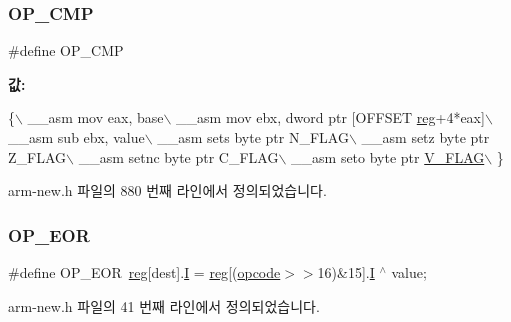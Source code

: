 \subsubsection{\texorpdfstring{O\+P\+\_\+\+C\+MP}{OP\_CMP}\hspace{0.1cm}{\footnotesize\ttfamily [2/2]}}
{\footnotesize\ttfamily \#define O\+P\+\_\+\+C\+MP}

{\bfseries 값\+:}
\begin{DoxyCode}
\{\(\backslash\)
       \_\_asm mov eax, base\(\backslash\)
       \_\_asm mov ebx, dword ptr [OFFSET \mbox{\hyperlink{_g_b_a_8h_ae29faba89509024ffd1a292badcedf2d}{reg}}+4*eax]\(\backslash\)
       \_\_asm sub ebx, value\(\backslash\)
       \_\_asm sets byte ptr N\_FLAG\(\backslash\)
       \_\_asm setz byte ptr Z\_FLAG\(\backslash\)
       \_\_asm setnc byte ptr C\_FLAG\(\backslash\)
       \_\_asm seto byte ptr \mbox{\hyperlink{_g_b_a_8h_a11a0e7b14a93be5eb2720b0151900919}{V\_FLAG}}\(\backslash\)
     \}
\end{DoxyCode}


arm-\/new.\+h 파일의 880 번째 라인에서 정의되었습니다.

\mbox{\label{arm-new_8h_a44564daea0fc9592c786bec61e18510e}} 
\subsubsection{\texorpdfstring{O\+P\+\_\+\+E\+OR}{OP\_EOR}\hspace{0.1cm}{\footnotesize\ttfamily [1/2]}}
{\footnotesize\ttfamily \#define O\+P\+\_\+\+E\+OR~\mbox{\hyperlink{_globals_8h_ae29faba89509024ffd1a292badcedf2d}{reg}}\mbox{[}dest\mbox{]}.\mbox{\hyperlink{thumb_8h_a782b7c7c9a56a2031f6270eac7f000d6}{I}} = \mbox{\hyperlink{_globals_8h_ae29faba89509024ffd1a292badcedf2d}{reg}}\mbox{[}(\mbox{\hyperlink{thumb_8h_a4fc220098f4b9d0e039a28274d05c198}{opcode}}$>$$>$16)\&15\mbox{]}.\mbox{\hyperlink{thumb_8h_a782b7c7c9a56a2031f6270eac7f000d6}{I}} $^\wedge$ value;}



arm-\/new.\+h 파일의 41 번째 라인에서 정의되었습니다.

\mbox{\label{_g_b_a_8cpp_a44564daea0fc9592c786bec61e18510e}} 
